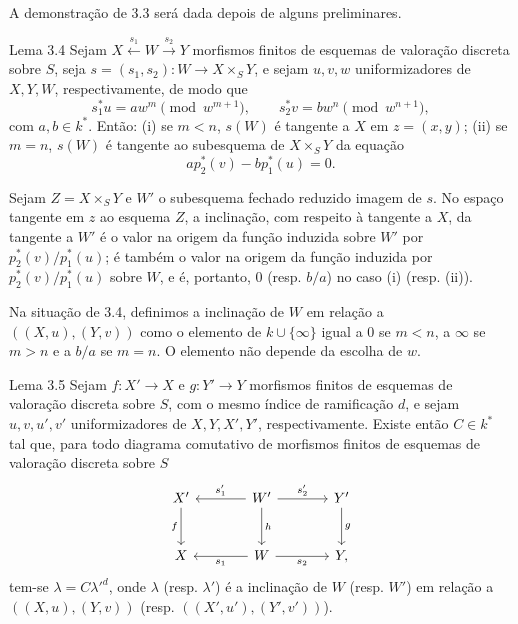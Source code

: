 A demonstração de 3.3 será dada depois de alguns preliminares.

\begin{statement}{Lema 3.4}
Sejam $X\xleftarrow{s_1}W\xrightarrow{s_2}Y$ morfismos finitos de esquemas de valoração discreta sobre $S$, seja $s=(s_1,s_2):W\to X\times_SY$, e sejam $u,v,w$ uniformizadores de $X,Y,W$, respectivamente, de modo que
\[
s_1^*u=aw^m\pmod {w^{m+1}},\qquad
s_2^*v=bw^n\pmod {w^{n+1}},
\]
com $a,b\in k^*$. Então: (i) se $m<n$, $s(W)$ é tangente a $X$ em $z=(x,y)$; (ii) se $m=n$, $s(W)$ é tangente ao subesquema de $X\times_SY$ da equação
\[
ap_2^*(v)-bp_1^*(u)=0.
\]
\end{statement}

Sejam $Z=X\times_SY$ e $W'$ o subesquema fechado reduzido imagem de $s$. No espaço tangente em $z$ ao esquema $Z$, a inclinação, com respeito à tangente a $X$, da tangente a $W'$ é o valor na origem da função induzida sobre $W'$ por $p_2^*(v)/p_1^*(u)$; é também o valor na origem da função induzida por $p_2^*(v)/p_1^*(u)$ sobre $W$, e é, portanto, $0$ (resp. $b/a$) no caso (i) (resp. (ii)).

Na situação de 3.4, definimos a inclinação de $W$ em relação a $((X,u),(Y,v))$ como o elemento de $k\cup\{\infty\}$ igual a $0$ se $m<n$, a $\infty$ se $m>n$ e a $b/a$ se $m=n$. O elemento não depende da escolha de $w$.

\begin{statement}{Lema 3.5}
Sejam $f:X'\to X$ e $g:Y'\to Y$ morfismos finitos de esquemas de valoração discreta sobre $S$, com o mesmo índice de ramificação $d$, e sejam $u,v,u',v'$ uniformizadores de $X,Y,X',Y'$, respectivamente. Existe então $C\in k^*$ tal que, para todo diagrama comutativo de morfismos finitos de esquemas de valoração discreta sobre $S$
\[
\begin{tikzcd}[column sep=large,row sep=large]
X' \arrow[d,"f"'] & W' \arrow[l,"s'_1"'] \arrow[r,"s'_2"] \arrow[d,"h"] & Y' \arrow[d,"g"]\\
X & W \arrow[l,"s_1"] \arrow[r,"s_2"'] & Y ,
\end{tikzcd}
\]
tem-se $\lambda=C{\lambda'}^d$, onde $\lambda$ (resp. $\lambda'$) é a inclinação de $W$ (resp. $W'$) em relação a $((X,u),(Y,v))$ (resp. $((X',u'),(Y',v'))$).
\end{statement}

